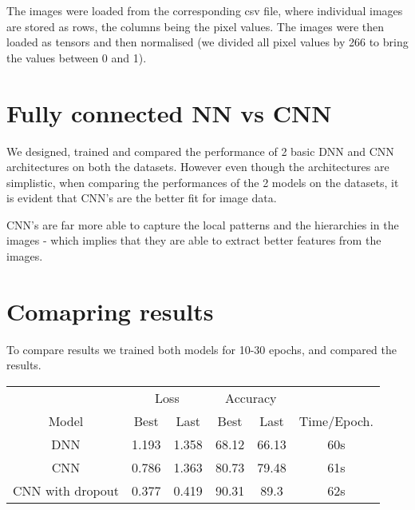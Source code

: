 \documentclass[12pt]{scrartcl}
\begin{document}
    The images were loaded from the corresponding csv file, where individual images are stored as rows, the columns being the pixel values. The images were then loaded as tensors and then normalised (we divided all pixel values by 266 to bring the values between 0 and 1).

    \section{Fully connected NN vs CNN}

    We designed, trained and compared the performance of 2 basic DNN and CNN architectures on both the datasets. However even though the architectures are simplistic, when comparing the performances of the 2 models on the datasets, it is evident that CNN's are the better fit for image data.

    CNN's are far more able to capture the local patterns and the hierarchies in the images - which implies that they are able to extract better features from the images.

    \section{Comapring results}

    To compare results we trained both models for 10-30 epochs, and compared the results.

    \begin{table}[H]
        \centering
        \begin{tabular}{c|c|c|c|c|c}
            ~ & \multicolumn{2}{c|}{Loss} & \multicolumn{2}{c|}{Accuracy} &  \\ 
            Model & Best & Last & Best & Last & Time/Epoch. \\ \hline\hline
            DNN & 1.193 & 1.358 & 68.12 & 66.13 & 60s \\
            CNN & 0.786 & 1.363 & 80.73 & 79.48 & 61s \\
            CNN with dropout & 0.377 & 0.419 & 90.31 & 89.3 & 62s \\
        \end{tabular}
    \end{table}
\end{document}
